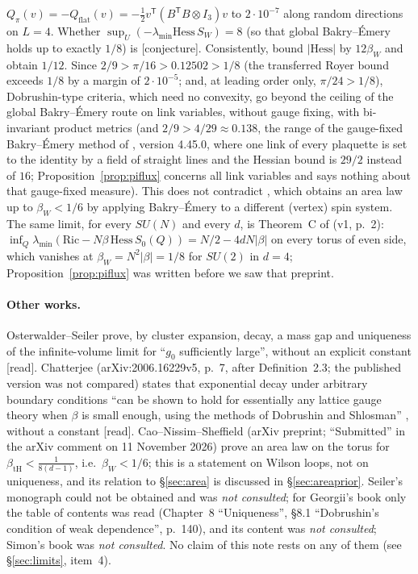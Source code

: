 \documentclass[11pt,a4paper]{article}
\theoremstyle{remark}
\theoremstyle{definition}
\theoremstyle{plain}
\theoremstyle{remark}
\newcommand{\st}[1]{\textsf{[#1]}}
\begin{document}
$Q_\pi(v)=-Q_{\text{flat}}(v)=-\frac12v^{\mathsf T}(B^{\mathsf T}B\otimes I_3)v$ to $2\cdot10^{-7}$ along random directions
on $L=4$. Whether $\sup_U(-\lambda_{\min}\mathrm{Hess}\,S_W)=8$ (so that global Bakry--\'Emery holds up to exactly
$1/8$) is \st{conjecture}. Consistently, \cite{SZZ23} bound $|\mathrm{Hess}|$ by $12\beta_W$ and obtain $1/12$.
Since $2/9>\pi/16>0.12502>1/8$ (the transferred Royer bound exceeds $1/8$ by a margin of $2\cdot10^{-5}$; and,
at leading order only, $\pi/24>1/8$), Dobrushin-type criteria, which need no convexity, go beyond the ceiling of
the global Bakry--\'Emery route on link variables, without gauge fixing, with bi-invariant product metrics (and $2/9>4/29\approx0.138$, the range of the gauge-fixed Bakry--\'Emery method of \cite[Theorem~A]{BB26e}, version 4.45.0, where one link of every plaquette is set to the identity by a field of straight lines and the Hessian bound is $29/2$ instead of $16$; Proposition~\ref{prop:piflux} concerns all link variables and says nothing about that gauge-fixed measure). This does not contradict
\cite{CNS25}, which obtains an area law up to $\beta_W<1/6$ by applying Bakry--\'Emery to a different (vertex)
spin system. The same limit, for every $SU(N)$ and every $d$, is Theorem~C of \cite{BB26} (v1, p.~2):
$\inf_Q\lambda_{\min}(\mathrm{Ric}-N\beta\,\mathrm{Hess}\,S_0(Q))=N/2-4dN|\beta|$ on every torus of even side, which vanishes at $\beta_W=N^2|\beta|=1/8$
for $SU(2)$ in $d=4$; Proposition~\ref{prop:piflux} was written before we saw that preprint.

\paragraph{Other works.} Osterwalder--Seiler \cite{OS78} prove, by cluster expansion, decay, a mass gap and
uniqueness of the infinite-volume limit for ``$g_0$ sufficiently large'', without an explicit constant
\st{read}. Chatterjee \cite{Cha21} (arXiv:2006.16229v5, p.~7, after Definition~2.3; the published version was not
compared) states that exponential decay under arbitrary boundary conditions ``can be shown to hold for
essentially any lattice gauge theory when $\beta$ is small enough, using the methods of Dobrushin and Shlosman''
\cite{DS85}, without a constant \st{read}. Cao--Nissim--Sheffield
\cite{CNS25} (arXiv preprint; ``Submitted'' in the arXiv comment on 11 November 2026) prove an area law on the torus for $\beta_{\mathrm{tH}}<\frac1{8(d-1)}$,
i.e.\ $\beta_W<1/6$; this is a statement on Wilson loops, not on uniqueness, and its relation to \S\ref{sec:area} is discussed in \S\ref{sec:areaprior}.
Seiler's monograph \cite{Sei82} could not be obtained and was \emph{not consulted}; for Georgii's book
\cite{Geo88} only the table of contents was read (Chapter~8 ``Uniqueness'', \S8.1 ``Dobrushin's condition of
weak dependence'', p.~140), and its content was \emph{not consulted}; Simon's book \cite{Sim93} was \emph{not
consulted}. No claim of this note rests on any of them (see \S\ref{sec:limits}, item~4).
\end{document}
